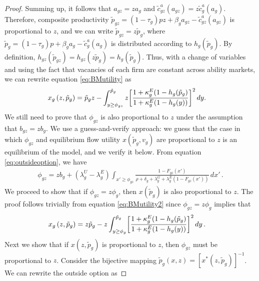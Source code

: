 \begin{proof}
    Summing up, it follows that $a_{gz} = z a_{g}$ and $\tilde{c}_{gz}^{a}(a_{gz}) = z \tilde{c}_{g}^{a}(a_{g})$. Therefore, composite productivity $\tilde{p}_{gz} = (1 - \tau_{g}) p z + \beta_{g} a_{gz} - \tilde{c}_{gz}^{a}(a_{gz})$ is proportional to $z$, and we can write $\tilde{p}_{gz} = z \tilde{p}_{g}$, where $\tilde{p}_{g} = (1-\tau_{g}) p + \beta_{g} a_{g} - \tilde{c}_{g}^{a}(a_{g})$ is distributed according to $h_{g}(\tilde{p}_{g})$. By definition, $h_{gz}(\tilde{p}_{gz}) = h_{gz}(z \tilde{p}_{g}) = h_{g}(\tilde{p}_{g})$. %
    Thus, with a change of variables and using the fact that vacancies of each firm are constant across ability markets, we can rewrite equation \eqref{eq:BMutility} as
    \begin{align}
        x_{g}\left(z,\tilde{p}_{g}\right) &= \tilde{p}_{g} z %
        - \int_{y \ge \phi_{gz}}^{\tilde{p}_{g}} z \biggl{[} \frac{1 + \kappa_{g}^{E} (1 - h_{g} (\tilde{p}_{g})}{1 + \kappa_{g}^{E} (1 - h_{g} (y))} \biggr{]}^2 \, d y. \label{eq:BMutility2}
    \end{align}
    We still need to prove that $\phi_{gz}$ is also proportional to $z$ under the assumption that $b_{gz} = z b_{g}$. We use a guess-and-verify approach: we guess that the case in which $\phi_{gz}$ and equilibrium flow utility $x\left(\tilde{p}_{g},v_{g}\right)$ are proportional to $z$ is an equilibrium of the model, and we verify it below. From equation \eqref{eq:outsideoption}, we have
    \begin{align}
        \phi_{gz} = z b_{g} + (\lambda_{g}^{U} - \lambda_{g}^{E}) \int_{x' \ge \phi_{gz}} \frac{1 - F_{gz}(x')}{\rho + \delta_{g} + \lambda_{g}^{G} + \lambda_{g}^{E} (1 - F_{gz}(x'))} \, d x' \, .
    \end{align}
    We proceed to show that if $\phi_{gz} = z \phi_{g}$, then $x\left(\tilde{p}_{g}\right)$ is also proportional to $z$. The proof follows trivially from equation \eqref{eq:BMutility2} since $\phi_{gz} = z \phi_{g}$ implies that
    \begin{align}
        x_{g}\left(z,\tilde{p}_{g}\right) &= z \tilde{p}_{g} %
        - z \int_{y \ge \phi_{g}}^{\tilde{p}_{g}} \biggl{[} \frac{1 + \kappa_{g}^{E} (1 - h_{g} (\tilde{p}_{g})}{1 + \kappa_{g}^{E} (1 - h_{g} (y))} \biggr{]}^2   \, d y \, .
    \end{align}
    Next we show that if $x\left(z,\tilde{p}_{g}\right)$ is proportional to $z$, then $\phi_{gz}$ must be proportional to $z$. Consider the bijective mapping $\tilde{p}_{g}(x,z) = [x^{*}(z,\tilde{p}_{g})]^{-1}$. We can rewrite the outside option as

\end{proof}
